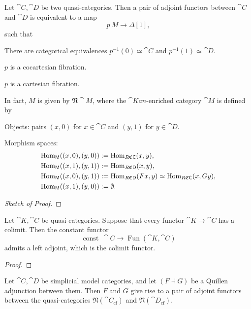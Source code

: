 \begin{proposition}
    Let $\cat C,\cat D$ be two quasi-categories.
    Then a pair of adjoint functors between $\cat C$ and $\cat D$
    is equivalent to a map 
    \[ p\:M\to\Delta[1], \]
    such that 
    \begin{itms}
        \item There are categorical equivalences
        $p^{-1}(0)\simeq\cat C$ and $p^{-1}(1)\simeq\cat D$.
        \item $p$ is a cocartesian fibration.
        \item $p$ is a cartesian fibration.
    \end{itms}
    In fact, $M$ is given by $\mathfrak N\cat M$,
    where the $\cat{Kan}$-enriched category $\cat M$ is defined by 
    \begin{itms}
        \item Objects: pairs $(x,0)$ for $x\in\cat C$ and $(y,1)$ for $y\in\cat D$.
        \item Morphism spaces:
        \[ \begin{aligned}
            \operatorname{Hom}_{\mathsf{M}}((x,0),(y,0)) &:= \operatorname{Hom}_{R\mathfrak C\mathsf{C}}(x,y), \\
            \operatorname{Hom}_{\mathsf{M}}((x,1),(y,1)) &:= \operatorname{Hom}_{R\mathfrak C\mathsf{D}}(x,y), \\
            \operatorname{Hom}_{\mathsf{M}}((x,0),(y,1)) &:= \operatorname{Hom}_{R\mathfrak C\mathsf{D}}(Fx,y)\simeq\operatorname{Hom}_{R\mathfrak C\mathsf{C}}(x,Gy), \\
            \operatorname{Hom}_{\mathsf{M}}((x,1),(y,0)) &:= \emptyset.
        \end{aligned} \]
    \end{itms}
\end{proposition}

\begin{proof}[Sketch of Proof]
    \nyw
\end{proof}

\begin{proposition}
    Let $\cat K,\cat C$ be quasi-categories.
    Suppose that every functor $\cat K\to\cat C$ has a colimit.
    Then the constant functor 
    \[ \operatorname{const}\:\cat C\to\operatorname{Fun}(\cat K,\cat C) \]
    admits a left adjoint, which is the colimit functor.
\end{proposition}

\begin{proof}
    \nyw
\end{proof}

\begin{remark}
    Let $\cat C,\cat D$ be simplicial model categories,
    and let $(F\dashv G)$ be a Quillen adjunction between them.
    Then $F$ and $G$ give rise to 
    a pair of adjoint functors between the quasi-categories
    $\mathfrak N(\cat C_{\mathrm{cf}})$ and
    $\mathfrak N(\cat D_{\mathrm{cf}})$. \varqed
\end{remark}
